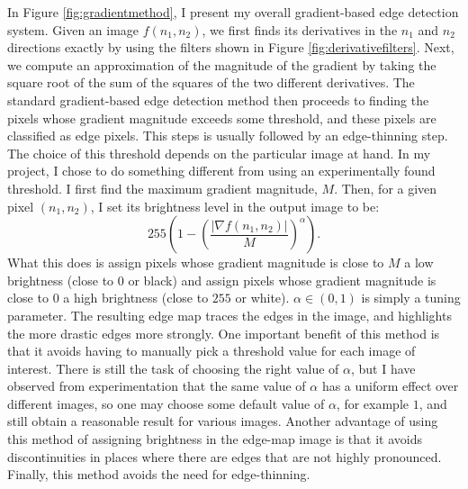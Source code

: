 \documentclass[12pt]{amsart}
\begin{document}
In Figure \ref{fig:gradientmethod}, I present my overall gradient-based edge detection system. Given an image $f(n_1, n_2)$, we first finds its derivatives in the $n_1$ and $n_2$ directions exactly by using the filters shown in Figure \ref{fig:derivativefilters}. Next, we compute an approximation of the magnitude of the gradient by taking the square root of the sum of the squares of the two different derivatives. The standard gradient-based edge detection method then proceeds to finding the pixels whose gradient magnitude exceeds some threshold, and these pixels are classified as edge pixels. This steps is usually followed by an edge-thinning step. The choice of this threshold depends on the particular image at hand. In my project, I chose to do something different from using an experimentally found threshold. I first find the maximum gradient magnitude, $M$. Then, for a given pixel $(n_1, n_2)$, I set its brightness level in the output image to be:
\begin{equation*}
255 \left(1 - \left(\frac{|\nabla f(n_1, n_2)|}{M}\right)^\alpha\right).
\end{equation*}
What this does is assign pixels whose gradient magnitude is close to $M$ a low brightness (close to $0$ or black) and assign pixels whose gradient magnitude is close to $0$ a high brightness (close to $255$ or white). $\alpha \in (0, 1)$ is simply a tuning parameter. The resulting edge map traces the edges in the image, and highlights the more drastic edges more strongly. One important benefit of this method is that it avoids having to manually pick a threshold value for each image of interest. There is still the task of choosing the right value of $\alpha$, but I have observed from experimentation that the same value of $\alpha$ has a uniform effect over different images, so one may choose some default value of $\alpha$, for example $1$, and still obtain a reasonable result for various images. Another advantage of using this method of assigning brightness in the edge-map image is that it avoids discontinuities in places where there are edges that are not highly pronounced. Finally, this method avoids the need for edge-thinning.
\end{document}
